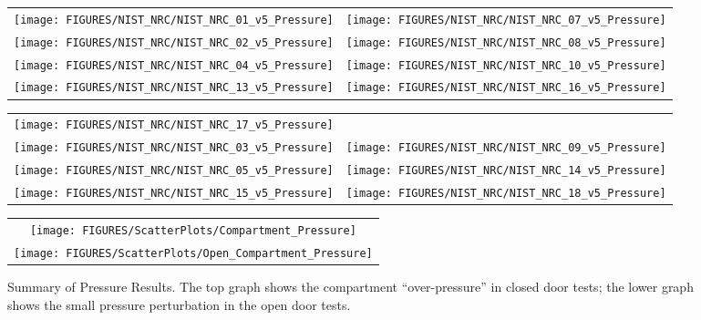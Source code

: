 \begin{figure}[p]
\begin{tabular*}{\textwidth}{l@{\extracolsep{\fill}}r}
\texttt{[image: FIGURES/NIST\_NRC/NIST\_NRC\_01\_v5\_Pressure]} &
\texttt{[image: FIGURES/NIST\_NRC/NIST\_NRC\_07\_v5\_Pressure]} \\
\texttt{[image: FIGURES/NIST\_NRC/NIST\_NRC\_02\_v5\_Pressure]} &
\texttt{[image: FIGURES/NIST\_NRC/NIST\_NRC\_08\_v5\_Pressure]} \\
\texttt{[image: FIGURES/NIST\_NRC/NIST\_NRC\_04\_v5\_Pressure]} &
\texttt{[image: FIGURES/NIST\_NRC/NIST\_NRC\_10\_v5\_Pressure]} \\
\texttt{[image: FIGURES/NIST\_NRC/NIST\_NRC\_13\_v5\_Pressure]} &
\texttt{[image: FIGURES/NIST\_NRC/NIST\_NRC\_16\_v5\_Pressure]}
\end{tabular*}
\label{NIST_NRC_Pressure_Closed}
\end{figure}

\begin{figure}[p]
\begin{tabular*}{\textwidth}{l@{\extracolsep{\fill}}r}
\texttt{[image: FIGURES/NIST\_NRC/NIST\_NRC\_17\_v5\_Pressure]} &
   \\
\texttt{[image: FIGURES/NIST\_NRC/NIST\_NRC\_03\_v5\_Pressure]} &
\texttt{[image: FIGURES/NIST\_NRC/NIST\_NRC\_09\_v5\_Pressure]} \\
\texttt{[image: FIGURES/NIST\_NRC/NIST\_NRC\_05\_v5\_Pressure]} &
\texttt{[image: FIGURES/NIST\_NRC/NIST\_NRC\_14\_v5\_Pressure]} \\
\texttt{[image: FIGURES/NIST\_NRC/NIST\_NRC\_15\_v5\_Pressure]} &
\texttt{[image: FIGURES/NIST\_NRC/NIST\_NRC\_18\_v5\_Pressure]}
\end{tabular*}
\label{NIST_NRC_Pressure_Open}
\end{figure}

\begin{figure}[p]
\begin{center}
\begin{tabular}{c}
\texttt{[image: FIGURES/ScatterPlots/Compartment\_Pressure]} \\
\texttt{[image: FIGURES/ScatterPlots/Open\_Compartment\_Pressure]}
\end{tabular}
\end{center}
\caption[Summary of pressure predictions, NIST/NRC test series.]
{Summary of Pressure Results. The top graph shows the compartment ``over-pressure'' in closed door tests; the lower graph
shows the small pressure perturbation in the open door tests.}
\end{figure}



